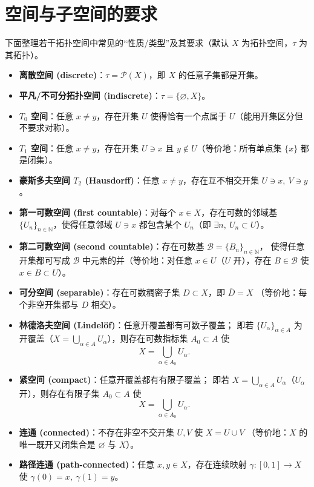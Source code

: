 \section{空间与子空间的要求}
\begin{note}
下面整理若干拓扑空间中常见的“性质/类型”及其要求（默认 $X$ 为拓扑空间，$\tau$ 为其拓扑）。
\begin{itemize}
  \item \textbf{离散空间 (discrete)}：$\tau=\mathcal P(X)$，即 $X$ 的任意子集都是开集。
  
  \item \textbf{平凡/不可分拓扑空间 (indiscrete)}：$\tau=\{\varnothing,X\}$。

  \item \textbf{$T_0$ 空间}：任意 $x\neq y$，存在开集 $U$ 使得恰有一个点属于 $U$（能用开集区分但不要求对称）。

  \item \textbf{$T_1$ 空间}：任意 $x\neq y$，存在开集 $U\ni x$ 且 $y\notin U$（等价地：所有单点集 $\{x\}$ 都是闭集）。

  \item \textbf{豪斯多夫空间 $T_2$ (Hausdorff)}：任意 $x\neq y$，存在互不相交开集 $U\ni x,\ V\ni y$。

 
  \item \textbf{第一可数空间 (first countable)}：对每个 $x\in X$，存在可数的邻域基 $\{U_n\}_{n\in\mathbb N}$，使得任意邻域 $U\ni x$ 都包含某个 $U_n$（即 $\exists n,\ U_n\subset U$）。

  \item \textbf{第二可数空间 (second countable)}：存在可数基 $\mathcal B=\{B_n\}_{n\in\mathbb N}$，
  使得任意开集都可写成 $\mathcal B$ 中元素的并（等价地：对任意 $x\in U$（$U$ 开），存在 $B\in\mathcal B$ 使 $x\in B\subset U$）。

  \item \textbf{可分空间 (separable)}：存在可数稠密子集 $D\subset X$，即 $\overline{D}=X$
  （等价地：每个非空开集都与 $D$ 相交）。

  \item \textbf{林德洛夫空间 (Lindel\"of)}：任意开覆盖都有可数子覆盖；
  即若 $\{U_\alpha\}_{\alpha\in A}$ 为开覆盖（$X=\bigcup_{\alpha\in A}U_\alpha$），则存在可数指标集 $A_0\subset A$ 使
  \[
  X=\bigcup_{\alpha\in A_0}U_\alpha.
  \]

  \item \textbf{紧空间 (compact)}：任意开覆盖都有有限子覆盖；
  即若 $X=\bigcup_{\alpha\in A}U_\alpha$（$U_\alpha$ 开），则存在有限子集 $A_0\subset A$ 使
  \[
  X=\bigcup_{\alpha\in A_0}U_\alpha.
  \]

 
  \item \textbf{连通 (connected)}：不存在非空不交开集 $U,V$ 使 $X=U\cup V$
  （等价地：$X$ 的唯一既开又闭集合是 $\varnothing$ 与 $X$）。

  \item \textbf{路径连通 (path-connected)}：任意 $x,y\in X$，存在连续映射 $\gamma:[0,1]\to X$ 使 $\gamma(0)=x,\ \gamma(1)=y$。
\end{itemize}
\end{note}
